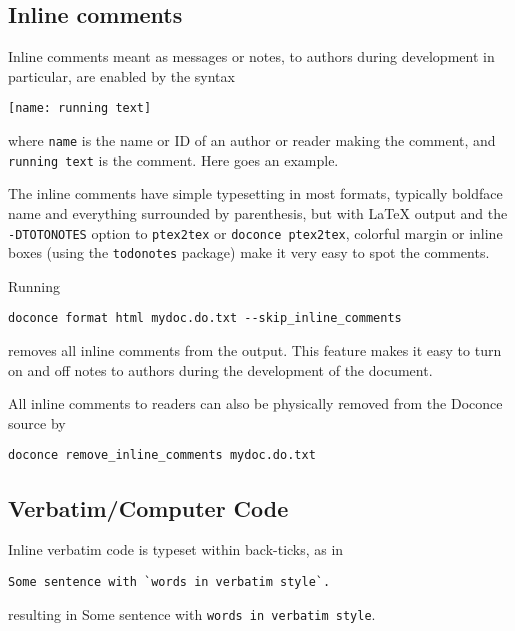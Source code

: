 \documentclass[%
oneside,                 %
final,                   %
10pt]{article}
\newcommand{\shortinlinecomment}[3]{}
\begin{document}
\subsection{Inline comments}

Inline comments meant as messages or notes, to authors during development
in particular,
are enabled by the syntax
\begin{Verbatim}[numbers=none,fontsize=\fontsize{9pt}{9pt},baselinestretch=0.85,xleftmargin=0mm]
[name: running text]
\end{Verbatim}
where \Verb!name! is the name or ID of an author or reader making the comment,
and \Verb!running text! is the comment. Here goes an example.
\shortinlinecomment{hpl 1}{ There must be a space after the colon,
but the running text can occupy multiple lines. }{ There must be a }
The inline comments have simple typesetting in most formats, typically boldface
name and everything surrounded by parenthesis, but with {\LaTeX}
output and the \Verb!-DTOTONOTES! option to \Verb!ptex2tex! or \Verb!doconce ptex2tex!,
colorful margin or inline boxes (using the \Verb!todonotes! package)
make it very easy to spot the comments.

Running
\begin{Verbatim}[numbers=none,fontsize=\fontsize{9pt}{9pt},baselinestretch=0.85,xleftmargin=0mm]
doconce format html mydoc.do.txt --skip_inline_comments
\end{Verbatim}
removes all inline comments from the output. This feature makes it easy
to turn on and off notes to authors during the development of the document.

All inline comments to readers can also be physically
removed from the Doconce source by
\begin{Verbatim}[numbers=none,fontsize=\fontsize{9pt}{9pt},baselinestretch=0.85,xleftmargin=0mm]
doconce remove_inline_comments mydoc.do.txt
\end{Verbatim}

\subsection{Verbatim/Computer Code}

Inline verbatim code is typeset within back-ticks, as in
\begin{Verbatim}[numbers=none,fontsize=\fontsize{9pt}{9pt},baselinestretch=0.85,xleftmargin=0mm]
Some sentence with `words in verbatim style`.
\end{Verbatim}
resulting in Some sentence with \Verb!words in verbatim style!.
\end{document}

